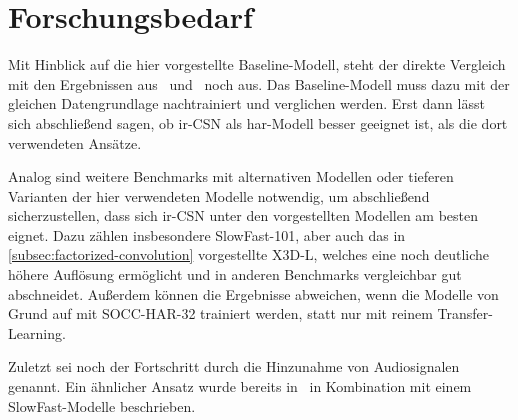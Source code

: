 \section{Forschungsbedarf}
\label{sec:fazit}

Mit Hinblick auf die hier vorgestellte Baseline-Modell, steht der direkte Vergleich mit den Ergebnissen aus~\cite{Giancola18} und~\cite{Jiang19} noch aus.
Das Baseline-Modell muss dazu mit der gleichen Datengrundlage nachtrainiert und verglichen werden.
Erst dann lässt sich abschließend sagen, ob ir-CSN als \gls{har}-Modell besser geeignet ist, als die dort verwendeten Ansätze.

Analog sind weitere Benchmarks mit alternativen Modellen oder tieferen Varianten der hier verwendeten Modelle notwendig, um abschließend sicherzustellen, dass sich ir-CSN unter den vorgestellten Modellen am besten eignet.
Dazu zählen insbesondere SlowFast-101, aber auch das in \autoref{subsec:factorized-convolution} vorgestellte X3D-L, welches eine noch deutliche höhere Auflösung ermöglicht und in anderen Benchmarks vergleichbar gut abschneidet.
Außerdem können die Ergebnisse abweichen, wenn die Modelle von Grund auf mit SOCC-HAR-32 trainiert werden, statt nur mit reinem Transfer-Learning.

Zuletzt sei noch der Fortschritt durch die Hinzunahme von Audiosignalen genannt.
Ein ähnlicher Ansatz wurde bereits in~\cite{Wang19} in Kombination mit einem SlowFast-Modelle beschrieben.
